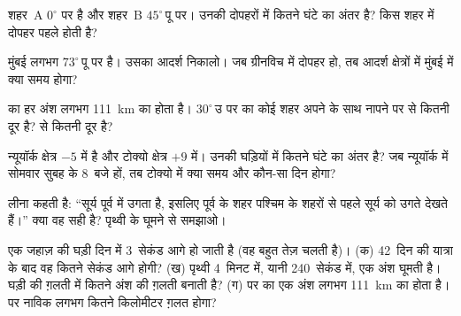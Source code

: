 \begin{exercise}[$\star\star$]\label{exo:g6:latitude-longitude:6}
शहर~A  $0^\circ$ पर है और शहर~B  $45^\circ$\,पू पर।
उनकी दोपहरों में कितने घंटे का अंतर है? किस शहर में दोपहर पहले होती है?
\end{exercise}

\begin{exercise}[$\star\star$]\label{exo:g6:latitude-longitude:7}
मुंबई लगभग $73^\circ$\,पू पर है। उसका आदर्श  निकालो। जब ग्रीनविच में
दोपहर हो, तब आदर्श क्षेत्रों में मुंबई में क्या समय होगा?
\end{exercise}

\begin{exercise}[$\star\star$]\label{exo:g6:latitude-longitude:8}
 का हर अंश लगभग \qty{111}{km} का होता है। $30^\circ$\,उ पर का कोई शहर अपने
 के साथ नापने पर  से कितनी दूर है?   से
कितनी दूर है?
\end{exercise}

\begin{exercise}[$\star\star$]\label{exo:g6:latitude-longitude:9}
न्यूयॉर्क क्षेत्र $-5$ में है और टोक्यो क्षेत्र $+9$ में। उनकी घड़ियों में कितने घंटे
का अंतर है? जब न्यूयॉर्क में सोमवार सुबह के 8~बजे हों, तब टोक्यो में क्या समय
और कौन-सा दिन होगा?
\end{exercise}

\begin{exercise}[$\star\star$]\label{exo:g6:latitude-longitude:10}
लीना कहती है: ``सूर्य पूर्व में उगता है, इसलिए पूर्व के शहर पश्चिम के शहरों से पहले
सूर्य को उगते देखते हैं।'' क्या वह सही है? पृथ्वी के घूमने से
समझाओ।
\end{exercise}

\begin{exercise}[$\star\star\star$]\label{exo:g6:latitude-longitude:11}
एक जहाज़ की घड़ी दिन में 3~सेकंड आगे हो जाती है (वह बहुत तेज़ चलती है)। (क) 42~दिन
की यात्रा के बाद वह कितने सेकंड आगे होगी? (ख) पृथ्वी 4~मिनट में, यानी 240~सेकंड
में, एक अंश घूमती है। घड़ी की ग़लती  में कितने अंश की ग़लती
बनाती है? (ग)  पर  का एक अंश लगभग \qty{111}{km} का होता है।
 पर नाविक लगभग कितने किलोमीटर
ग़लत होगा?
\end{exercise}

